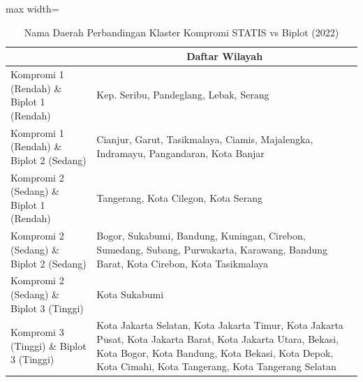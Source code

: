 \begin{table}[H]
\centering
\caption{Nama Daerah Perbandingan Klaster Kompromi STATIS vs Biplot (2022)} \label{tab:app1biplot_comp_name_2022}
\begin{adjustbox}{max width=\textwidth}
\begin{tabular}{|>{\centering\arraybackslash}p{4cm}|p{10cm}|}
\hline
\multicolumn{1}{|c|}{\textbf{Kategori}} & \multicolumn{1}{c|}{\textbf{Daftar Wilayah}} \\
\hline
Kompromi 1 (Rendah) \& Biplot 1 (Rendah) & Kep. Seribu, Pandeglang, Lebak, Serang \\
\hline
Kompromi 1 (Rendah) \& Biplot 2 (Sedang) & Cianjur, Garut, Tasikmalaya, Ciamis, Majalengka, Indramayu, Pangandaran, Kota Banjar \\
\hline
Kompromi 2 (Sedang) \& Biplot 1 (Rendah) & Tangerang, Kota Cilegon, Kota Serang \\
\hline
Kompromi 2 (Sedang) \& Biplot 2 (Sedang) & Bogor, Sukabumi, Bandung, Kuningan, Cirebon, Sumedang, Subang, Purwakarta, Karawang, Bandung Barat, Kota Cirebon, Kota Tasikmalaya \\
\hline
Kompromi 2 (Sedang) \& Biplot 3 (Tinggi) & Kota Sukabumi \\
\hline
Kompromi 3 (Tinggi) \& Biplot 3 (Tinggi) & Kota Jakarta Selatan, Kota Jakarta Timur, Kota Jakarta Pusat, Kota Jakarta Barat, Kota Jakarta Utara, Bekasi, Kota Bogor, Kota Bandung, Kota Bekasi, Kota Depok, Kota Cimahi, Kota Tangerang, Kota Tangerang Selatan \\
\hline
\end{tabular}
\end{adjustbox}
\end{table}